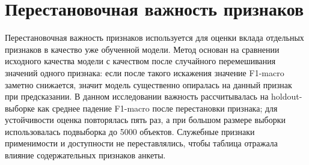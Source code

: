 \documentclass[14pt,a4paper]{extreport}
\begin{document}
\section{Перестановочная важность признаков}

Перестановочная важность признаков используется для оценки вклада отдельных признаков в качество уже обученной модели. Метод основан на сравнении исходного качества модели с качеством после случайного перемешивания значений одного признака: если после такого искажения значение F1-macro заметно снижается, значит модель существенно опиралась на данный признак при предсказании. В данном исследовании важность рассчитывалась на holdout-выборке как среднее падение F1-macro после перестановки признака; для устойчивости оценка повторялась пять раз, а при большом размере выборки использовалась подвыборка до 5000 объектов. Служебные признаки применимости и доступности не переставлялись, чтобы таблица отражала влияние содержательных признаков анкеты.
\end{document}
